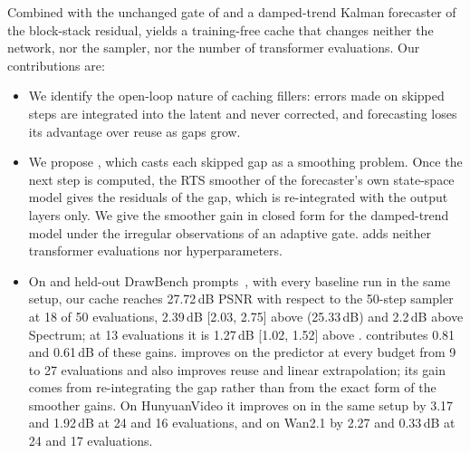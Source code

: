 Combined with the unchanged \sea gate of \seacache and a damped-trend Kalman forecaster of the block-stack residual,
\pcgs yields a training-free cache that changes neither the network, nor the sampler, nor the number of transformer
evaluations. Our contributions are:
\begin{itemize}[leftmargin=*,itemsep=1pt,topsep=2pt]
  \item We identify the open-loop nature of caching fillers: errors made on skipped steps are integrated into the
  latent and never corrected, and forecasting loses its advantage over reuse as gaps grow.
  \item We propose \pcgs, which casts each skipped gap as a smoothing problem. Once the next step is computed, the RTS
  smoother of the forecaster's own state-space model gives the residuals of the gap, which is re-integrated with the
  output layers only. We give the smoother gain in closed form for the damped-trend model under the irregular
  observations of an adaptive gate. \pcgs adds neither transformer evaluations nor hyperparameters.
  \item On \flux and held-out DrawBench prompts~\cite{saharia2022imagen}, with every baseline run in the same setup,
  our cache reaches 27.72\,dB PSNR with respect to the 50-step sampler at 18 of 50 evaluations, 2.39\,dB
  [2.03, 2.75] above \seacache (25.33\,dB) and 2.2\,dB above Spectrum; at 13 evaluations it is 1.27\,dB [1.02, 1.52]
  above \seacache. \pcgs contributes 0.81 and 0.61\,dB of these gains. \pcgs improves on the
  predictor at every budget from 9 to 27 evaluations and also improves reuse and linear extrapolation; its gain comes
  from re-integrating the gap rather than from the exact form of the smoother gains. On HunyuanVideo it improves on
  \seacache in the same setup by 3.17 and 1.92\,dB at 24 and 16 evaluations, and on Wan2.1 by 2.27 and 0.33\,dB at 24 and
  17 evaluations.
\end{itemize}

